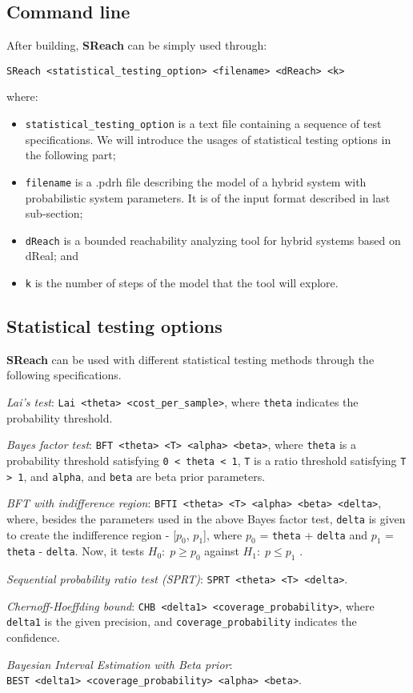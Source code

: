 \subsection{Command line}
After building, {\bf SReach} can be simply used through:
\begin{verbatim} 
SReach <statistical_testing_option> <filename> <dReach> <k> 
\end{verbatim} 
where:
\begin{itemize}
\item \verb+statistical_testing_option+ is a text file containing a sequence of test specifications. We will introduce the usages of statistical testing options in the following part;
\item \verb+filename+ is a .pdrh file describing the model of a hybrid system with probabilistic system parameters. It is of the input format described in last sub-section;
\item \verb+dReach+ is a bounded reachability analyzing tool for hybrid systems based on dReal; and
\item \verb+k+ is the number of steps of the model that the tool will explore.\\
\end{itemize}

\subsection{Statistical testing options}

{\bf SReach} can be used with different statistical testing methods through the following specifications.

\textit {Lai's test}: \verb+Lai <theta> <cost_per_sample>+, where \verb+theta+ indicates the probability threshold.
 
\textit {Bayes factor test}: \verb+BFT <theta> <T> <alpha> <beta>+,
where \verb+theta+ is a probability threshold satisfying \verb+0 < theta < 1+, \verb+T+ is a ratio threshold satisfying \verb+T > 1+, and \verb+alpha+, and \verb+beta+ are beta prior parameters.

\textit {BFT with indifference region}: \verb+BFTI <theta> <T> <alpha> <beta> <delta>+,
where, besides the parameters used in the above Bayes factor test, \verb+delta+ is given to create the indifference region - [$p_0$, $p_1$], where $p_0$ = \verb+theta+ + \verb+delta+ and $p_1$ = \verb+theta+  - \verb+delta+.  Now, it tests $H_0 :\; p \ge p_0$ against $H_1:\; p \le p_1$ .

\textit {Sequential probability ratio test (SPRT)}: \verb+SPRT <theta> <T> <delta>+.

\textit {Chernoff-Hoeffding bound}: \verb+CHB <delta1> <coverage_probability>+,
where \verb+delta1+ is the given precision, and \verb+coverage_probability+ indicates the confidence.

\textit {Bayesian Interval Estimation with Beta prior}: \\ \verb+BEST <delta1> <coverage_probability> <alpha> <beta>+.


